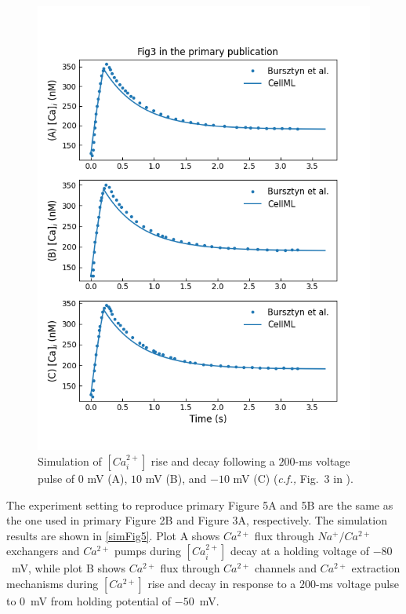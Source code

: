 \documentclass[fleqn,10pt]{physiome}
\begin{document}
\begin{figure}
\begin{minipage}[t]{\dimexpr.5\textwidth-0.2em}
  \includegraphics[width=\linewidth]{./figs/simFig3.png}
  \caption{Simulation of $[Ca_{i}^{2+}]$ rise and decay following a $200$-ms voltage pulse of $0$ mV (A), $10$ mV (B), and $-10$ mV (C) (\emph{c.f.,} Fig.~3 in \citet{bursztyn2007mathematical}).}
  \label{simFig3}
\end{minipage}
\end{figure}

The experiment setting to reproduce primary Figure 5A and 5B are the same as the one used in primary Figure 2B and Figure 3A, respectively. The simulation results are shown in \autoref{simFig5}. Plot A shows $Ca^{2+}$ flux through $Na^{+}/Ca^{2+}$ exchangers and $Ca^{2+}$ pumps during $[Ca_{i}^{2+}]$ decay at a holding voltage of $-80$~mV, while plot B shows $Ca^{2+}$ flux through $Ca^{2+}$ channels and $Ca^{2+}$ extraction mechanisms during $[Ca^{2+}]$ rise and decay in response to a $200$-ms voltage pulse to $0$~mV from holding potential of $-50$~mV.
\end{document}
